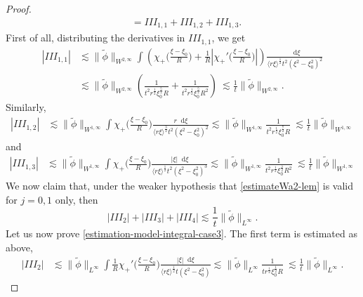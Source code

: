 \documentclass[11 pt]{amsart}
\theoremstyle{definition}
\theoremstyle{remark}
\numberwithin{equation}{section}
\newcommand{\dd}{\mathop{}\!\mathrm{d}}
\begin{document}
\begin{proof}
\begin{align*}
& = III_{1,1} + III_{1,2} + III_{1,3}.
\end{align*}
First of all, distributing the derivatives in $III_{1,1}$, we get
\begin{align*}
|III_{1,1}| & \lesssim \| \tilde \phi \|_{W^{2,\infty}} \int \left( \chi_+\big( \frac{\xi - \xi_0}{R}\big)+\frac{1}{R}|\chi_+'\big( \frac{\xi - \xi_0}{R}\big)| \right) \frac{\dd\xi}{\langle r \xi\rangle^{\frac 12}t^2(\xi^2-\xi_0^2)^2} \\
&\lesssim  \| \tilde \phi \|_{W^{2,\infty}}\left(\frac{1}{t^2r^{\frac 12}\xi_0^{\frac 52}R}+\frac{1}{t^2r^{\frac 12}\xi_0^{\frac 52}R^2}\right) \ \lesssim \frac 1t \| \tilde \phi \|_{W^{2,\infty}}.
\end{align*}
Similarly,
\begin{align*}
|III_{1,2}| & \lesssim \| \tilde \phi \|_{W^{1,\infty}} \int  \chi_+\big( \frac{\xi - \xi_0}{R}\big)  \frac{r \dd\xi}{\langle r \xi\rangle^{\frac 32}t^2(\xi^2-\xi_0^2)^2} \lesssim \| \tilde \phi \|_{W^{1,\infty}} \frac{1}{t^2r^{\frac 12}\xi_0^{\frac 72}R} \ \lesssim \frac 1t \| \tilde \phi \|_{W^{1,\infty}}
\end{align*}
and
\begin{align*}
|III_{1,3}| & \lesssim \| \tilde \phi \|_{W^{1,\infty}} \int \chi_+\big( \frac{\xi - \xi_0}{R}\big) \frac{|\xi| \dd\xi}{\langle r \xi\rangle^{\frac 12}t^2(\xi^2-\xi_0^2)^3} \lesssim  \| \tilde \phi \|_{W^{1,\infty}} \frac{1}{t^2r^{\frac 12}\xi_0^{\frac 52}R^2} \ \lesssim \frac 1t \| \tilde \phi \|_{W^{1,\infty}}
\end{align*}
We now claim that, under the weaker hypothesis that \eqref{estimateWa2-lem} is valid for $j=0,1$ only, then
\begin{equation} \label{estimation-model-integral-case3}
|III_2|+|III_3|+|III_4|\lesssim \frac{1}{t}\| \widetilde{\phi} \|_{L^\infty}.
\end{equation}
Let us now prove \eqref{estimation-model-integral-case3}. The first term is estimated as above,
\begin{align*}
|III_{2}| & \lesssim \| \tilde \phi \|_{L^\infty} \int \frac{1}{R} \chi_+' \big( \frac{\xi - \xi_0}{R}\big) \frac{|\xi| \dd\xi}{\langle r \xi\rangle^{\frac 12}t (\xi^2-\xi_0^2)} \lesssim  \| \tilde \phi \|_{L^{\infty}} \frac{1}{t r^{\frac 12}\xi_0^{\frac 12}R} \ \lesssim \frac 1t \| \tilde \phi \|_{L^{\infty}}.
\end{align*}


\end{proof}
\end{document}
